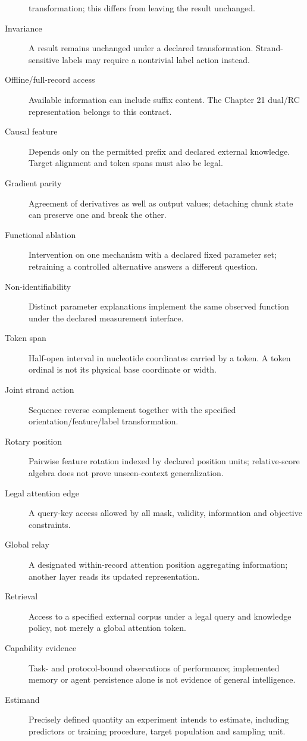 \begin{description}
transformation; this differs from leaving the result unchanged.
\item[Invariance] A result remains unchanged under a declared transformation.
Strand-sensitive labels may require a nontrivial label action instead.
\item[Offline/full-record access] Available information can include suffix
content. The Chapter 21 dual/RC representation belongs to this contract.
\item[Causal feature] Depends only on the permitted prefix and declared
external knowledge. Target alignment and token spans must also be legal.
\item[Gradient parity] Agreement of derivatives as well as output values;
detaching chunk state can preserve one and break the other.
\item[Functional ablation] Intervention on one mechanism with a declared fixed
parameter set; retraining a controlled alternative answers a different question.
\item[Non-identifiability] Distinct parameter explanations implement the same
observed function under the declared measurement interface.
\item[Token span] Half-open interval in nucleotide coordinates carried by a token.
A token ordinal is not its physical base coordinate or width.
\item[Joint strand action] Sequence reverse complement together with the
specified orientation/feature/label transformation.
\item[Rotary position] Pairwise feature rotation indexed by declared position
units; relative-score algebra does not prove unseen-context generalization.
\item[Legal attention edge] A query-key access allowed by all mask, validity,
information and objective constraints.
\item[Global relay] A designated within-record attention position aggregating
information; another layer reads its updated representation.
\item[Retrieval] Access to a specified external corpus under a legal query and
knowledge policy, not merely a global attention token.
\item[Capability evidence] Task- and protocol-bound observations of performance;
implemented memory or agent persistence alone is not evidence of general intelligence.
\item[Estimand] Precisely defined quantity an experiment intends to estimate,
including predictors or training procedure, target population and sampling unit.

\end{description}
